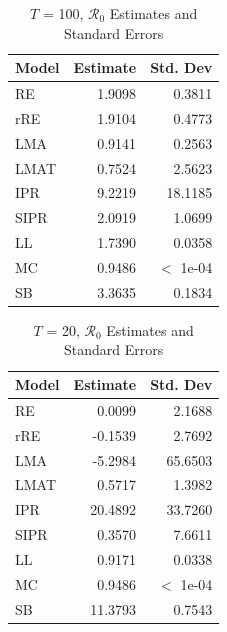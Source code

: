 \documentclass[12pt]{article}
\newcommand{\rr}{\ensuremath{\mathcal{R}_0}}
\begin{document}
\begin{table}[H]
	
	
	\centering
	\begin{tabular}[t]{l|r|r}
		\hline
		Model & Estimate & Std. Dev\\
		\hline
		RE & 1.9098 & 0.3811\\
		\hline
		rRE & 1.9104 & 0.4773\\
		\hline
		LMA & 0.9141 & 0.2563\\
		\hline
		LMAT & 0.7524 & 2.5623\\
		\hline
		IPR & 9.2219 & 18.1185\\
		\hline
		SIPR & 2.0919 & 1.0699\\
		\hline
		LL & 1.7390 & 0.0358\\
		\hline
		MC & 0.9486 & $<$ 1e-04\\
		\hline
		SB & 3.3635 & 0.1834\\
		\hline
	\end{tabular}
	\caption{ $T$ = 100, $\rr$ Estimates and Standard Errors}
\end{table}

\begin{table}[H]
	\centering
	\begin{tabular}[t]{l|r|r}
		\hline
		Model & Estimate & Std. Dev\\
		\hline
		RE & 0.0099 & 2.1688\\
		\hline
		rRE & -0.1539 & 2.7692\\
		\hline
		LMA & -5.2984 & 65.6503\\
		\hline
		LMAT & 0.5717 & 1.3982\\
		\hline
		IPR & 20.4892 & 33.7260\\
		\hline
		SIPR & 0.3570 & 7.6611\\
		\hline
		LL & 0.9171 & 0.0338\\
		\hline
		MC & 0.9486 & $<$ 1e-04\\
		\hline
		SB & 11.3793 & 0.7543\\
		\hline
	\end{tabular}
	\caption{$T$ = 20, $\rr$ Estimates and Standard Errors}
\end{table}
\end{document}

